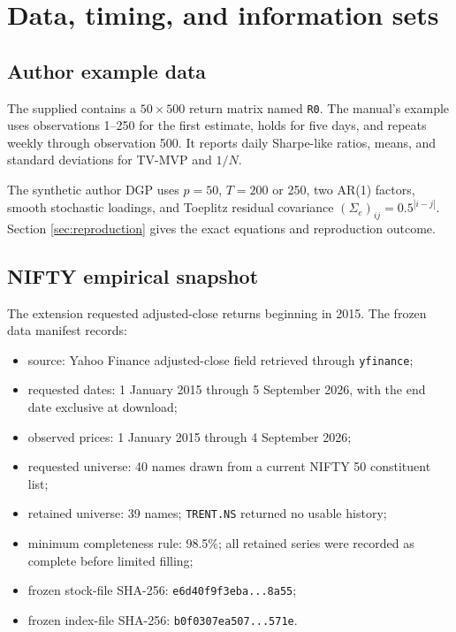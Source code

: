 \documentclass[11pt,a4paper]{article}
\newcommand{\code}[1]{\texttt{#1}}
\begin{document}
\section{Data, timing, and information sets}

\subsection{Author example data}

The supplied  contains a $50\times500$ return matrix named \code{R0}. The manual's example uses observations 1--250 for the first estimate, holds for five days, and repeats weekly through observation 500. It reports daily Sharpe-like ratios, means, and standard deviations for TV-MVP and $1/N$.

The synthetic author DGP uses $p=50$, $T=200$ or 250, two AR(1) factors, smooth stochastic loadings, and Toeplitz residual covariance $(\Sigma_e)_{ij}=0.5^{|i-j|}$. Section \ref{sec:reproduction} gives the exact equations and reproduction outcome.

\subsection{NIFTY empirical snapshot}

The extension requested adjusted-close returns beginning in 2015. The frozen data manifest records:

\begin{itemize}
  \item source: Yahoo Finance adjusted-close field retrieved through \code{yfinance};
  \item requested dates: 1 January 2015 through 5 September 2026, with the end date exclusive at download;
  \item observed prices: 1 January 2015 through 4 September 2026;
  \item requested universe: 40 names drawn from a current NIFTY 50 constituent list;
  \item retained universe: 39 names; \code{TRENT.NS} returned no usable history;
  \item minimum completeness rule: 98.5\%; all retained series were recorded as complete before limited filling;
  \item frozen stock-file SHA-256: \code{e6d40f9f3eba...8a55};
  \item frozen index-file SHA-256: \code{b0f0307ea507...571e}.
\end{itemize}
\end{document}
